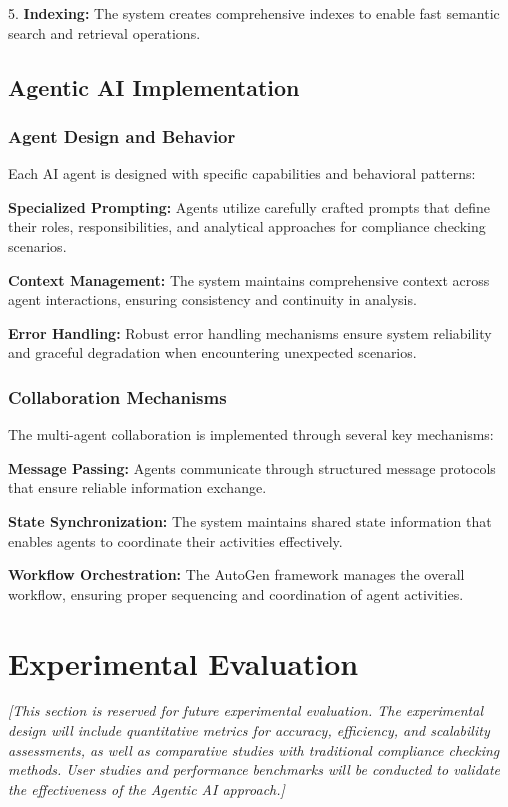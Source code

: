 \documentclass[conference]{IEEEtran}
\begin{document}
5. \textbf{Indexing:} The system creates comprehensive indexes to enable fast semantic search and retrieval operations.

\subsection{Agentic AI Implementation}

\subsubsection{Agent Design and Behavior}
Each AI agent is designed with specific capabilities and behavioral patterns:

\textbf{Specialized Prompting:} Agents utilize carefully crafted prompts that define their roles, responsibilities, and analytical approaches for compliance checking scenarios.

\textbf{Context Management:} The system maintains comprehensive context across agent interactions, ensuring consistency and continuity in analysis.

\textbf{Error Handling:} Robust error handling mechanisms ensure system reliability and graceful degradation when encountering unexpected scenarios.

\subsubsection{Collaboration Mechanisms}
The multi-agent collaboration is implemented through several key mechanisms:

\textbf{Message Passing:} Agents communicate through structured message protocols that ensure reliable information exchange.

\textbf{State Synchronization:} The system maintains shared state information that enables agents to coordinate their activities effectively.

\textbf{Workflow Orchestration:} The AutoGen framework manages the overall workflow, ensuring proper sequencing and coordination of agent activities.

\section{Experimental Evaluation}

\textit{[This section is reserved for future experimental evaluation. The experimental design will include quantitative metrics for accuracy, efficiency, and scalability assessments, as well as comparative studies with traditional compliance checking methods. User studies and performance benchmarks will be conducted to validate the effectiveness of the Agentic AI approach.]}
\end{document}

